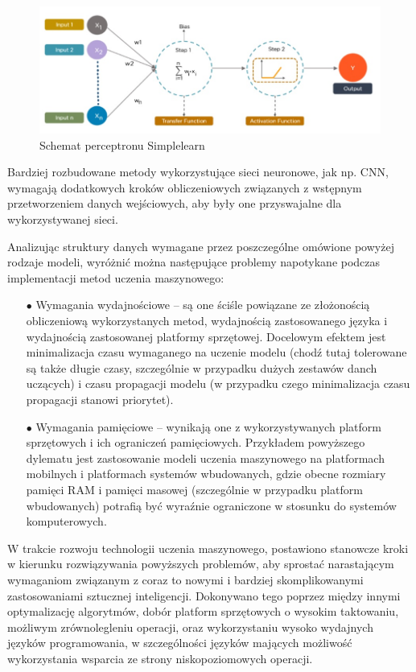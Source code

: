 \begin{figure}[!ht]
    \centering
    \includegraphics[width=150mm]{Rysunki/Rozdzial2/perceptron.jpg}
    \caption{Schemat perceptronu \dywiz{} Simplelearn}
    \label{fig:nn}
\end{figure}

Bardziej rozbudowane metody wykorzystujące sieci neuronowe, jak np. CNN, wymagają dodatkowych kroków obliczeniowych związanych z wstępnym przetworzeniem danych wejściowych, aby były one przyswajalne dla wykorzystywanej sieci.

Analizując struktury danych wymagane przez poszczególne omówione powyżej rodzaje modeli, wyróżnić można następujące problemy napotykane podczas implementacji metod uczenia maszynowego:

\begin{itemize}
    \item [$\bullet$] Wymagania wydajnościowe -- są one ściśle powiązane ze złożonością obliczeniową wykorzystanych metod, wydajnością zastosowanego języka i wydajnością zastosowanej platformy sprzętowej. Docelowym efektem jest minimalizacja czasu wymaganego na uczenie modelu (chodź tutaj tolerowane są także długie czasy, szczególnie w przypadku dużych zestawów danch uczących) i czasu propagacji modelu (w przypadku czego minimalizacja czasu propagacji stanowi priorytet).
    
    \item [$\bullet$] Wymagania pamięciowe -- wynikają one z wykorzystywanych platform sprzętowych i ich ograniczeń pamięciowych. Przykładem powyższego dylematu jest zastosowanie modeli uczenia maszynowego na platformach mobilnych i platformach systemów wbudowanych, gdzie obecne rozmiary pamięci RAM i pamięci masowej (szczególnie w przypadku platform wbudowanych) potrafią być wyraźnie ograniczone w stosunku do systemów komputerowych.
\end{itemize}

W trakcie rozwoju technologii uczenia maszynowego, postawiono stanowcze kroki w kierunku rozwiązywania powyższych problemów, aby sprostać narastającym wymaganiom związanym z coraz to nowymi i bardziej skomplikowanymi zastosowaniami sztucznej inteligencji. Dokonywano tego poprzez między innymi optymalizację algorytmów, dobór platform sprzętowych o wysokim taktowaniu, możliwym zrównolegleniu operacji, oraz wykorzystaniu wysoko wydajnych języków programowania, w szczególności języków mających możliwość wykorzystania wsparcia ze strony niskopoziomowych operacji.

